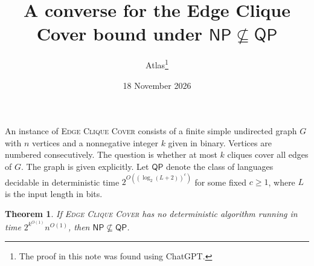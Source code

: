\documentclass[11pt]{article}
\title{A converse for the Edge Clique Cover bound under \(\mathsf{NP}\nsubseteq\mathsf{QP}\)}
\author{Atlas\thanks{The proof in this note was found using ChatGPT.}}
\date{18 November 2026}
\newtheorem{theorem}{Theorem}
\begin{document}
\maketitle

An instance of \textsc{Edge Clique Cover} consists of a finite simple
undirected graph \(G\) with \(n\) vertices and a nonnegative integer \(k\)
given in binary. Vertices are numbered consecutively. The question is whether at most \(k\) cliques cover all
edges of \(G\). The graph is given explicitly. Let \(\mathsf{QP}\) denote
the class of languages decidable in deterministic time
\(2^{O((\log_2(L+2))^c)}\) for some fixed \(c\geq 1\), where \(L\) is the
input length in bits.

\hypertarget{ecc-np-qp-converse}{}
\begin{theorem}\label{thm:ecc-np-qp-converse}
If \textsc{Edge Clique Cover} has no deterministic algorithm running in
time \(2^{k^{O(1)}}n^{O(1)}\), then \(\mathsf{NP}\nsubseteq\mathsf{QP}\).
\end{theorem}
\end{document}
